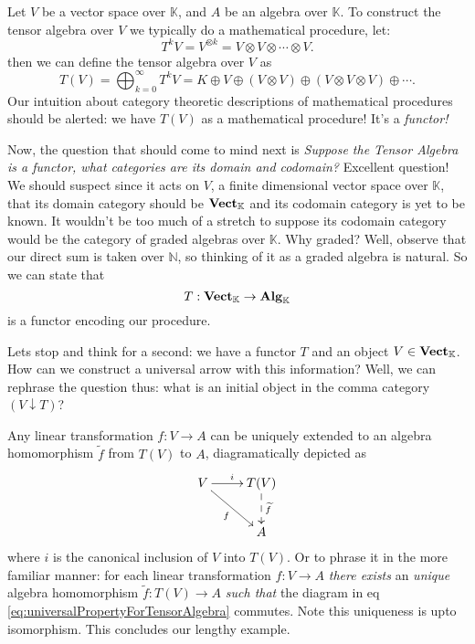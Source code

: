 \begin{ex}
Let $V$ be a vector space over $\mathbb{K}$, and $A$ be an
algebra over $\mathbb{K}$. To construct the tensor algebra over
$V$ we typically do a mathematical procedure, let:
\begin{equation}%
T^kV = V^{\otimes k} = V\otimes V \otimes \cdots \otimes V. 
\end{equation}
then we can define the tensor algebra over $V$ as
\begin{equation}%
T(V)= \bigoplus_{k=0}^\infty T^kV = K\oplus V \oplus (V\otimes V) \oplus (V\otimes V\otimes V) \oplus \cdots.
\end{equation}
Our intuition about category theoretic descriptions of
mathematical procedures should be alerted: we have $T(V)$ as a
mathematical procedure! It's a \emph{functor!} 

Now, the question that should come to mind next is \emph{Suppose the Tensor Algebra is a functor, what categories are its domain and codomain?}
Excellent question! We should suspect since it acts on $V$, a
finite dimensional vector space over $\mathbb{K}$, that its
domain category should be $\mathbf{Vect}_{\mathbb{K}}$ and its
codomain category is yet to be known. It wouldn't be too much of
a stretch to suppose its codomain category would be the category
of graded algebras over $\mathbb{K}$. Why
graded? Well, observe that our direct sum is taken
over $\mathbb{N}$, so thinking of it as a graded algebra is
natural. So we can state that
\begin{equation}
T:\mathbf{Vect}_{\mathbb{K}}\to\mathbf{Alg}_{\mathbb{K}}
\end{equation}
is a functor encoding our procedure.

Lets stop and think for a second: we have a functor $T$ and an
object $V\in\mathbf{Vect}_{\mathbb{K}}$. How can we construct a
universal arrow with this information? Well, we can rephrase the
question thus: what is an initial object in the comma category $(V\downarrow{}T)$?

Any linear transformation $f:V\to{}A$ can be uniquely extended to
an algebra homomorphism $\widetilde{f}$ from $T(V)$ to $A$, diagramatically
depicted as
\begin{equation}\label{eq:universalPropertyForTensorAlgebra}
\vcenter{\xymatrix{
V\ar[dr]_{f}\ar[r]^{i} & T(V)\ar@{-->}[d]^{\widetilde{f}}\\
& A
}}
\end{equation}
where $i$ is the canonical inclusion of $V$ into $T(V)$. Or to
phrase it in the more familiar manner: for each linear
transformation $f:V\to{}A$ \emph{there exists} an \emph{unique} algebra
homomorphism $\widetilde{f}:T(V)\to{}A$ \emph{such that} the
diagram in eq \eqref{eq:universalPropertyForTensorAlgebra}
commutes. Note this uniqueness is upto isomorphism. This
concludes our lengthy example.
\end{ex}

